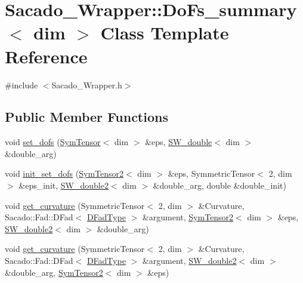 \hypertarget{classSacado__Wrapper_1_1DoFs__summary}{}\section{Sacado\+\_\+\+Wrapper\+:\+:Do\+Fs\+\_\+summary$<$ dim $>$ Class Template Reference}
\label{classSacado__Wrapper_1_1DoFs__summary}


{\ttfamily \#include $<$Sacado\+\_\+\+Wrapper.\+h$>$}

\subsection*{Public Member Functions}
\begin{DoxyCompactItemize}
\item 
void \hyperlink{classSacado__Wrapper_1_1DoFs__summary_a556293f6e683cb30151d9faadc2cc90d}{set\+\_\+dofs} (\hyperlink{classSacado__Wrapper_1_1SymTensor}{Sym\+Tensor}$<$ dim $>$ \&eps, \hyperlink{classSacado__Wrapper_1_1SW__double}{S\+W\+\_\+double}$<$ dim $>$ \&double\+\_\+arg)
\item 
void \hyperlink{classSacado__Wrapper_1_1DoFs__summary_ae273d0fa3197118a11d7005523e27d8a}{init\+\_\+set\+\_\+dofs} (\hyperlink{classSacado__Wrapper_1_1SymTensor2}{Sym\+Tensor2}$<$ dim $>$ \&eps, Symmetric\+Tensor$<$ 2, dim $>$ \&eps\+\_\+init, \hyperlink{classSacado__Wrapper_1_1SW__double2}{S\+W\+\_\+double2}$<$ dim $>$ \&double\+\_\+arg, double \&double\+\_\+init)
\item 
void \hyperlink{classSacado__Wrapper_1_1DoFs__summary_adf29bfda10814ecee9572a4751d34db0}{get\+\_\+curvature} (Symmetric\+Tensor$<$ 2, dim $>$ \&Curvature, Sacado\+::\+Fad\+::\+D\+Fad$<$ \hyperlink{Sacado__Wrapper_8h_a7e0893207b87dad05c66a34baac8ed2e}{D\+Fad\+Type} $>$ \&argument, \hyperlink{classSacado__Wrapper_1_1SymTensor2}{Sym\+Tensor2}$<$ dim $>$ \&eps, \hyperlink{classSacado__Wrapper_1_1SW__double2}{S\+W\+\_\+double2}$<$ dim $>$ \&double\+\_\+arg)
\item 
void \hyperlink{classSacado__Wrapper_1_1DoFs__summary_abc10231129de5c52fd9aba22701aa5fa}{get\+\_\+curvature} (Symmetric\+Tensor$<$ 2, dim $>$ \&Curvature, Sacado\+::\+Fad\+::\+D\+Fad$<$ \hyperlink{Sacado__Wrapper_8h_a7e0893207b87dad05c66a34baac8ed2e}{D\+Fad\+Type} $>$ \&argument, \hyperlink{classSacado__Wrapper_1_1SW__double2}{S\+W\+\_\+double2}$<$ dim $>$ \&double\+\_\+arg, \hyperlink{classSacado__Wrapper_1_1SymTensor2}{Sym\+Tensor2}$<$ dim $>$ \&eps)

\end{DoxyCompactItemize}
